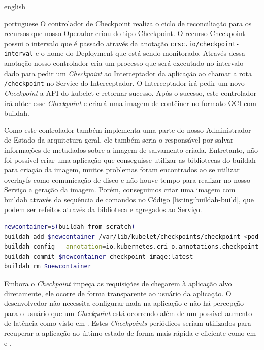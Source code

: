 \begin{otherlanguage*}{english}
\begin{otherlanguage*}{portuguese}
O controlador de Checkpoint realiza o ciclo de reconciliação para os recursos que nosso
Operador criou do tipo Checkpoint. O recurso Checkpoint possui o intervalo que é
passado através da anotação \texttt{crsc.io/checkpoint-interval} e o nome do Deployment
que está sendo monitorado. Através dessa anotação nosso controlador cria um processo que
será executado no intervalo dado para pedir um \textit{Checkpoint} ao Interceptador da
aplicação ao chamar a rota \texttt{/checkpoint} no Service do Interceptador. O Interceptador
irá pedir um novo \textit{Checkpoint} a API do kubelet e retornar sucesso. Após o sucesso,
este controlador irá obter esse \textit{Checkpoint} e criará uma imagem de contêiner no
formato OCI com buildah.

Como este controlador também implementa uma parte do nosso Administrador de Estado da 
arquitetura geral, ele também seria o responsável por salvar informações de metadados
sobre a imagem de salvamento criada. Entretanto, não foi possível criar uma aplicação
que conseguisse utilizar as bibliotecas do buildah para criação da imagem, muitos
problemas foram encontrados ao se utilizar overlayfs como comunicação de disco e não
houve tempo para realizar no nosso Serviço a geração da imagem. Porém, conseguimos criar
uma imagem com buildah através da sequência de comandos no Código
\ref{listing:buildah-build}, que podem ser refeitos através da biblioteca e agregados ao
Serviço.

\begin{lstlisting}[language=bash,caption={Comandos do buildah para construir a imagem de recuperação a partir de um Checkpoint feito pelo CRIU através do kubelet.},label={listing:buildah-build}]
newcontainer=$(buildah from scratch)
buildah add $newcontainer /var/lib/kubelet/checkpoints/checkpoint-<pod-name>_<namespace-name>-<container-name>-<timestamp>.tar /
buildah config --annotation=io.kubernetes.cri-o.annotations.checkpoint.name=<container-name> $newcontainer
buildah commit $newcontainer checkpoint-image:latest
buildah rm $newcontainer
\end{lstlisting}

Embora o \textit{Checkpoint} impeça as requisições de chegarem à aplicação alvo
diretamente, ele ocorre de forma transparente ao usuário da aplicação. O desenvolvedor
não necessita configurar nada na aplicação e não há percepção para o usuário que um
\textit{Checkpoint} está ocorrendo além de um possível aumento de latência como visto em
\cite{schmidttransparent}. Estes \textit{Checkpoints} periódicos seriam utilizados para
recuperar a aplicação ao último estado de forma mais rápida e eficiente como em
\cite{vayghan2021kubernetes} \cite{muller2022architecture} \cite{oh2018stateful} e
\cite{schmidttransparent}.


\end{otherlanguage*}
\end{otherlanguage*}
